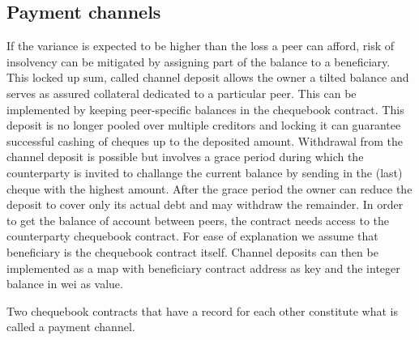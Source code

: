 \documentclass[a4paper,10pt]{article}
\begin{document}
\subsection{Payment channels}

If the variance is expected to be higher than the loss a peer can afford,
risk of insolvency can be mitigated by assigning part of the balance to a beneficiary.
This locked up sum, called \gls{channel deposit} allows the owner a tilted balance and
serves as assured collateral dedicated to a particular peer.
This can be implemented by keeping peer-specific balances in the chequebook contract.
This deposit is no longer pooled over multiple creditors
and locking it can guarantee successful cashing of cheques up to the deposited amount.
Withdrawal from the channel deposit is possible but involves a grace period during which
the counterparty is invited to challange the current balance by sending in the (last) cheque
with the highest amount. After the grace period the owner can reduce the deposit to cover only
its actual debt and may withdraw the remainder.
In order to get the balance of account between peers, the contract needs access to the counterparty
chequebook contract. For ease of explanation we assume that beneficiary is the
chequebook contract itself. Channel deposits can then be implemented as a map with beneficiary contract
address as key and the integer balance in wei as value.

Two chequebook contracts that have a record for each other constitute what is
called a \gls{payment channel}.
\end{document}
